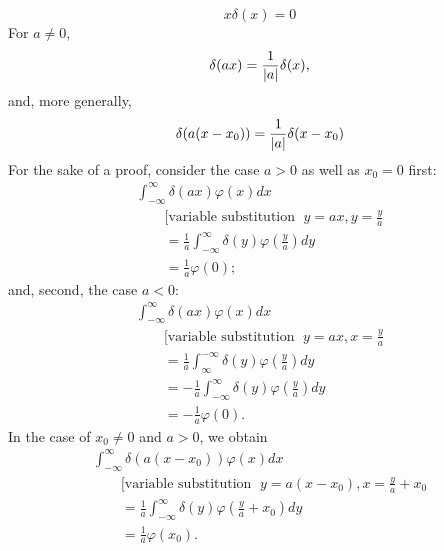  \begin{equation}
 x\delta (x)=0
 \end{equation}
For $a\neq 0$,
 \begin{equation}
 \delta (ax)={1\over \vert a\vert }\delta (x),
\label{2011-m-distdp}
 \end{equation}
and, more generally,
 \begin{equation}
 \delta (a(x-x_0))={1\over \vert a\vert }\delta (x-x_0)
\label{2011-m-distdpmg}
 \end{equation}
{\color{OliveGreen}
\bproof
For the sake of a proof,  consider the case $a>0$ as well as $x_0=0$ first:
 \begin{equation}
 \begin{split}
\int _{-\infty}^\infty \delta (ax)  \varphi (x)  dx
\\
\qquad [\textrm{variable substitution }\; y = ax, y=\frac{y}{a}\\
\qquad =
\frac{1}{a}\int _{-\infty}^\infty \delta (y)  \varphi (\frac{y}{a}) dy  \\
\qquad =    \frac{1}{a}  \varphi (0);
 \end{split}
 \end{equation}
and, second, the case $a<0$:
 \begin{equation}
 \begin{split}
\int _{-\infty}^\infty \delta (ax)  \varphi (x)  dx     \\
\qquad [\textrm{variable substitution }\; y = ax, x=\frac{y}{a}\\
\qquad =
\frac{1}{a}\int _\infty^{-\infty} \delta (y)  \varphi (\frac{y}{a}) dy \\
\qquad =
- \frac{1}{a}\int _{-\infty}^\infty \delta (y)  \varphi (\frac{y}{a}) dy       \\
\qquad =   - \frac{1}{a}  \varphi (0).
 \end{split}
 \end{equation}
In the case of $x_0\neq 0$ and $a>0$, we obtain
\begin{equation}
 \begin{split}
\int _{-\infty}^\infty \delta (a(x-x_0))  \varphi (x)  dx
\\
\qquad [\textrm{variable substitution }\; y = a(x-x_0), x=\frac{y}{a}+x_0\\
\qquad =
\frac{1}{a}\int _{-\infty}^\infty \delta (y)  \varphi (\frac{y}{a}+x_0) dy  \\
\qquad =    \frac{1}{a}  \varphi (x_0).
 \end{split}
 \end{equation}
\eproof
}

